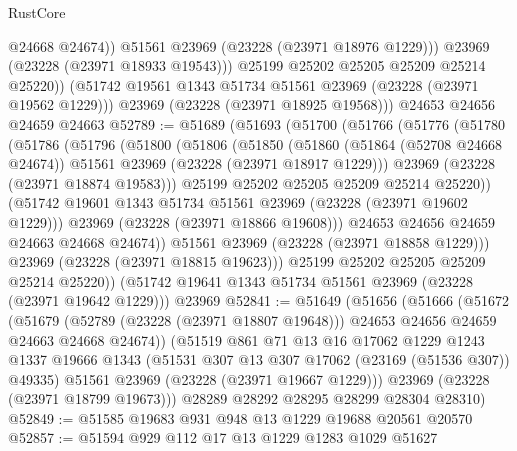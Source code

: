 \begin{lexlean}{RustCore}
\begin{coremodule}
                  @24668
                  @24674))
              @51561
              @23969
              (@23228 (@23971 @18976 @1229)))
            @23969
            (@23228 (@23971 @18933 @19543)))
          @25199
          @25202
          @25205
          @25209
          @25214
          @25220))
      (@51742 @19561 @1343 @51734 @51561 @23969 (@23228 (@23971 @19562 @1229)))
      @23969
      (@23228 (@23971 @18925 @19568)))
    @24653
    @24656
    @24659
    @24663
@52789 := @51689
    (@51693
      (@51700
        (@51766
          (@51776
            (@51780
              (@51786
                (@51796
                  (@51800
                    (@51806
                      (@51850
                        (@51860
                          (@51864 (@52708 @24668 @24674))
                          @51561
                          @23969
                          (@23228 (@23971 @18917 @1229)))
                        @23969
                        (@23228 (@23971 @18874 @19583)))
                      @25199
                      @25202
                      @25205
                      @25209
                      @25214
                      @25220))
                  (@51742 @19601 @1343 @51734 @51561 @23969 (@23228 (@23971 @19602 @1229)))
                  @23969
                  (@23228 (@23971 @18866 @19608)))
                @24653
                @24656
                @24659
                @24663
                @24668
                @24674))
            @51561
            @23969
            (@23228 (@23971 @18858 @1229)))
          @23969
          (@23228 (@23971 @18815 @19623)))
        @25199
        @25202
        @25205
        @25209
        @25214
        @25220))
    (@51742 @19641 @1343 @51734 @51561 @23969 (@23228 (@23971 @19642 @1229)))
    @23969
@52841 := @51649
    (@51656
      (@51666
        (@51672
          (@51679
            (@52789 (@23228 (@23971 @18807 @19648)))
            @24653
            @24656
            @24659
            @24663
            @24668
            @24674))
        (@51519
          @861
          @71
          @13
          @16
          @17062
          @1229
          @1243
          @1337
          @19666
          @1343
          (@51531 @307 @13 @307 @17062 (@23169 (@51536 @307)) @49335)
          @51561
          @23969
          (@23228 (@23971 @19667 @1229)))
        @23969
        (@23228 (@23971 @18799 @19673)))
      @28289
      @28292
      @28295
      @28299
      @28304
      @28310)
@52849 := @51585 @19683 @931 @948 @13 @1229 @19688 @20561 @20570
@52857 := @51594 @929 @112 @17 @13 @1229 @1283 @1029 @51627

\end{coremodule}
\end{lexlean}
